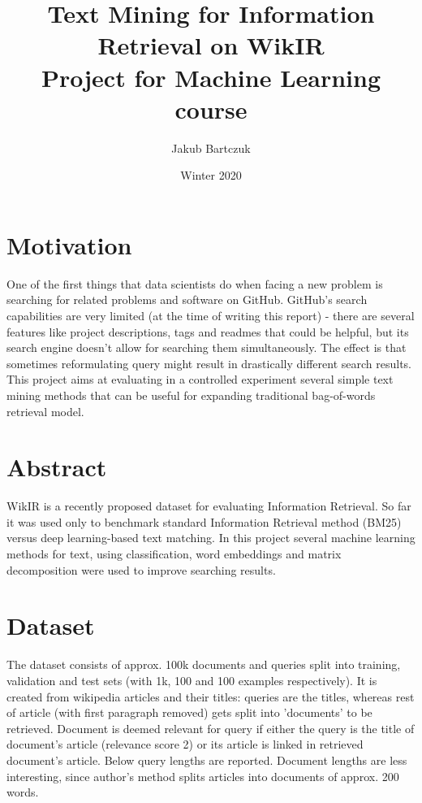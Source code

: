 \documentclass{article}
\title{}
\title{%
  Text Mining for Information Retrieval on WikIR \\
  \large Project for Machine Learning course}
\author{Jakub Bartczuk}
\date{Winter 2020}
\begin{document}
\maketitle

\section{Motivation}
One of the first things that data scientists do when facing a new problem is searching for related problems and software on GitHub. GitHub's search capabilities are very limited (at the time of writing this report) - there are several features like project descriptions, tags and readmes that could be helpful, but its search engine doesn't allow for searching them simultaneously. The effect is that sometimes reformulating query might result in drastically different search results. This project aims at evaluating in a controlled experiment several simple text mining methods that can be useful for expanding traditional bag-of-words retrieval model.

\section{Abstract}

WikIR \citep{frej2019wikir} is a recently proposed dataset for evaluating Information Retrieval. So far it was used only to benchmark standard Information Retrieval method (BM25)\citep{manning2008introduction} versus deep learning-based text matching. In this project several machine learning methods for text, using classification, word embeddings and matrix decomposition were used to improve searching results.

\section{Dataset}
The dataset consists of approx. 100k documents and queries split into training, validation and test sets (with 1k, 100 and 100 examples respectively). It is created from wikipedia articles and their titles: queries are the titles, whereas rest of article (with first paragraph removed) gets split into 'documents' to be retrieved. Document is deemed relevant for query if either the query is the title of document's article (relevance score 2) or its article is linked in retrieved document's article. Below query lengths are reported. Document lengths are less interesting, since author's method splits articles into documents of approx. 200 words.
\end{document}
